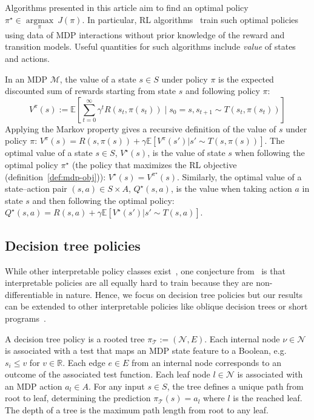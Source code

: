 Algorithms presented in this article aim to find an optimal policy $\pi^\star \in\underset{\pi}{\operatorname{argmax}}\ J(\pi)$.
In particular, RL algorithms~\citep{sutton,watkins1992q,dqn} train such optimal policies using data of MDP interactions without prior knowledge of the reward and transition models.
Useful quantities for such algorithms include \textit{value} of states and actions.
\begin{definition}\label{def:vs} 
In an MDP $\mathcal{M}$, the value of a state $s\in S$ under policy $\pi$ is the expected discounted sum of rewards starting from state $s$ and following policy $\pi$:
{\small
$$V^\pi(s) := \mathbb{E}\left[\sum_{t=0}^{\infty} \gamma^t R(s_t, \pi(s_t)) \mid s_0 = s, s_{t+1} \sim T(s_t, \pi(s_t))\right]$$}
Applying the Markov property gives a recursive definition of the value of $s$ under policy $\pi$: $V^\pi(s) = R(s,\pi(s)) + \gamma \mathbb{E}\left[V^\pi(s') | s'\sim T(s, \pi(s))\right]$.
The optimal value of a state $s\in S$, $V^\star(s)$, is the value of state $s$ when following the optimal policy $\pi^{\star}$ (the policy that maximizes the RL objective (definition~\ref{def:mdp-obj})): $V^{\star}(s) = V^{\pi^{\star}}(s)$.
Similarly, the optimal value of a state–action pair $(s,a)\in S\times A$, $Q^\star(s,a)$, is the value when taking action $a$ in state $s$ and then following the optimal policy: $Q^{\star}(s,a) = R(s, a) + \gamma\mathbb{E}\left[V^{\star}(s') | s'\sim T(s, a)\right]$.
\end{definition}

\subsection{Decision tree policies}
While other interpretable policy classes exist~\citep{kohler2025evaluating}, one conjecture from~\cite{glanois-survey} is that interpretable policies are all equally hard to train because they are non-differentiable in nature.
Hence, we focus on decision tree policies but our results can be extended to other interpretable policies like oblique decision trees or short programs~\citep{PIRL}.

\begin{definition}\label{def:dt}
A decision tree policy is a rooted tree $\pi_{\mathcal{T}} := (\mathcal{N}, E)$.
Each internal node $\nu \in \mathcal{N}$ is associated with a test that maps an MDP state feature to a Boolean, e.g. $s_{i}\leq v$ for $v\in \mathbb{R}$.
Each edge $e \in E$ from an internal node corresponds to an outcome of the associated test function.
Each leaf node $l \in \mathcal{N}$ is associated with an MDP action $a_l \in A$.
For any input $s \in S$, the tree defines a unique path from root to leaf, determining the prediction $\pi_{\mathcal{T}}(s) = a_l$ where $l$ is the reached leaf.
The depth of a tree is the maximum path length from root to any leaf.
\end{definition}

